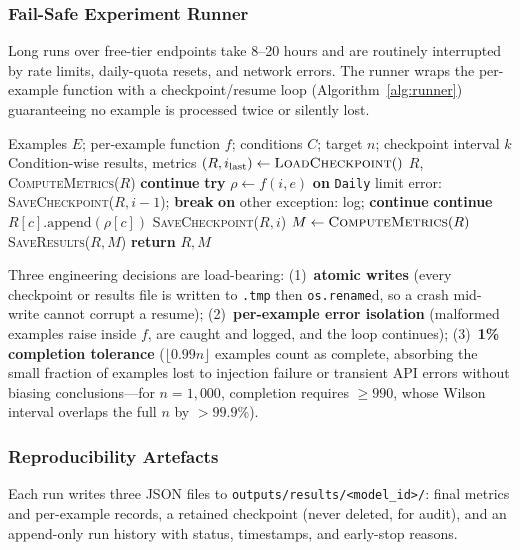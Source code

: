 \subsubsection{Fail-Safe Experiment Runner}

Long runs over free-tier endpoints take 8--20 hours and are routinely interrupted by rate limits, daily-quota resets, and network errors. The runner wraps the per-example function with a checkpoint/resume loop (Algorithm~\ref{alg:runner}) guaranteeing no example is processed twice or silently lost.

\begin{algorithm}[!ht]
\caption{Fail-Safe Experiment Runner with Checkpoint/Resume}
\label{alg:runner}
\begin{algorithmic}[1]
\Require Examples $E$; per-example function $f$; conditions $C$; target $n$; checkpoint interval $k$
\Ensure Condition-wise results, metrics
\State $(R, i_{\text{last}}) \gets \textsc{LoadCheckpoint}()$ 
 \Return $R$, \textsc{ComputeMetrics}($R$) \EndIf
{}
     \textbf{continue}  \EndIf
    \State \textbf{try} $\rho \gets f(i, e)$ 
    \State \hspace{1em} \textbf{on} \texttt{Daily} limit error: \textsc{SaveCheckpoint}($R, i{-}1$); \textbf{break}
    \State \hspace{1em} \textbf{on} other exception: log; \textbf{continue} 
     \textbf{continue} \EndIf
     \State $R[c].\text{append}(\rho[c])$ \EndFor
     \State \textsc{SaveCheckpoint}($R, i$) \EndIf
\EndFor
\State $M \gets \textsc{ComputeMetrics}(R)$
 \textsc{SaveResults}($R, M$)  \EndIf
\State \textbf{return} $R, M$
\end{algorithmic}
\end{algorithm}

Three engineering decisions are load-bearing: (1)~\textbf{atomic writes} (every checkpoint or results file is written to \texttt{.tmp} then \texttt{os.rename}d, so a crash mid-write cannot corrupt a resume); (2)~\textbf{per-example error isolation} (malformed examples raise inside $f$, are caught and logged, and the loop continues); (3)~\textbf{1\% completion tolerance} ($\lfloor 0.99 n \rfloor$ examples count as complete, absorbing the small fraction of examples lost to injection failure or transient API errors without biasing conclusions---for $n=1{,}000$, completion requires $\geq 990$, whose Wilson interval overlaps the full $n$ by $>99.9\%$).

\subsubsection{Reproducibility Artefacts}

Each run writes three JSON files to \texttt{outputs/results/<model\_id>/}: final metrics and per-example records, a retained checkpoint (never deleted, for audit), and an append-only run history with status, timestamps, and early-stop reasons.
